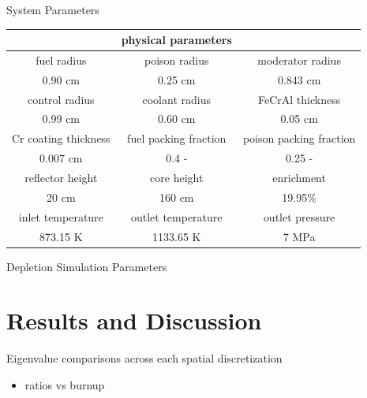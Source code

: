 \documentclass[9pt,t,aspectratio=169]{beamer}
\begin{document}
\begin{frame}{System Parameters}
    \begin{table}[h]
        \centering
        \begin{tabular}{|c|c|c|}
        \hline 
        & physical parameters & \\
        \hline
        fuel radius & poison radius & moderator radius  \\
        0.90 cm & 0.25 cm   & 0.843 cm  \\
        \hline
        control radius & coolant radius & FeCrAl thickness \\
        0.99 cm    & 0.60 cm & 0.05 cm \\
        \hline
        Cr coating thickness & fuel packing fraction & poison packing fraction \\
        0.007 cm & 0.4 -  & 0.25 - \\
        \hline
        reflector height & core height & enrichment \\
        \hline
        20 cm & 160 cm &  19.95\% \\
        \hline
        inlet temperature & outlet temperature & outlet pressure \\
        \hline
        873.15 K & 1133.65 K  & 7 MPa \\
        \hline
        \end{tabular}
        \vspace{-0.25cm}
        \label{tab:dimensions}
    \end{table}
\end{frame}

\begin{frame}{Depletion Simulation Parameters}

\end{frame}
\section{Results and Discussion}

\begin{frame}{Eigenvalue comparisons across each spatial discretization}
    \begin{itemize}
        \item ratios vs burnup
    \end{itemize}
\end{frame}
\end{document}
